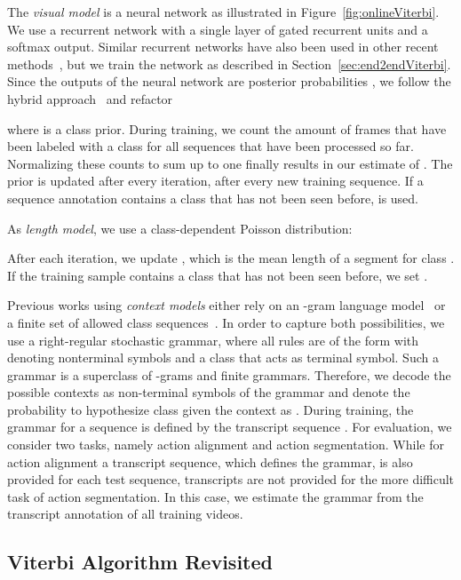 \documentclass[10pt,twocolumn,letterpaper]{article}
\begin{document}
The \textit{visual model} is a neural network as illustrated in Figure~\ref{fig:onlineViterbi}. We use a recurrent network with a single layer of  gated recurrent units
and a softmax output. Similar recurrent networks have also been used in other
recent methods~\cite{huang2016connectionist,richard2017weakly}, but we train the network as described in Section~\ref{sec:end2endViterbi}. Since the outputs of the neural network are posterior probabilities , we follow the hybrid approach~\cite{bourlard2012connectionist} and refactor

where  is a class prior. During training, we count the amount of frames that have
been labeled with a class  for all sequences that have been processed so far.
Normalizing these counts to sum up to one finally results in our estimate of .
The prior is updated after every iteration, \ie after every new training sequence.
If a sequence annotation  contains a class that has not been seen
before,  is used.

As \textit{length model}, we use a class-dependent Poisson distribution:  

After each iteration, we update , which is the mean length of a segment for class .
If the training sample  contains a class that has not been seen before, we set \mbox{.}

Previous works using \textit{context models} either rely on an
-gram language model~\cite{richard2016temporal,koller2017resign} or a finite
set of allowed class sequences~\cite{kuehne2017weakly,richard2017weakly}. In order
to capture both possibilities, we use a right-regular stochastic grammar, where all rules
are of the form  with  denoting nonterminal symbols and a class
 that acts as terminal symbol.
Such a grammar is a superclass of -grams and finite grammars. 
Therefore, we decode the possible contexts  as non-terminal
symbols  of the grammar and denote the probability to hypothesize class 
given the context  as . During training, the grammar for a sequence is defined by the transcript sequence . For evaluation, we consider two tasks, namely action alignment and action segmentation. While for action alignment a transcript sequence, which defines the grammar, is also provided for each test sequence, transcripts are not provided for the more difficult task of action segmentation. In this case, we estimate the grammar from the transcript annotation of all training videos.




\subsection{Viterbi Algorithm Revisited}
\label{sec:viterbiRevisited}
\end{document}
